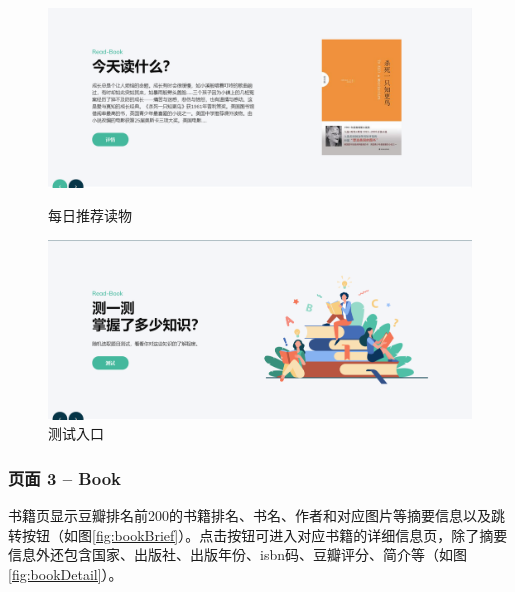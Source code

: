 \documentclass[twoside,11pt]{article}
\begin{document}
\begin{figure}[htbp]
    \begin{minipage}[t]{0.5\linewidth}
        \centering
        \includegraphics[width=0.9\columnwidth]{figures/homeRe.png}
        \caption{每日推荐读物}\label{fig:homeRe}
    \end{minipage}
    \begin{minipage}[t]{0.5\linewidth}
        \centering
        \includegraphics[width=0.9\columnwidth]{figures/homeTest.png}
        \caption{测试入口}\label{fig:homeTest}
    \end{minipage}
\end{figure}

\subsubsection{页面 3 -- Book}

书籍页显示豆瓣排名前200的书籍排名、书名、作者和对应图片等摘要信息以及跳转按钮（如图\ref{fig:bookBrief}）。点击按钮可进入对应书籍的详细信息页，除了摘要信息外还包含国家、出版社、出版年份、isbn码、豆瓣评分、简介等（如图\ref{fig:bookDetail}）。
\end{document}
